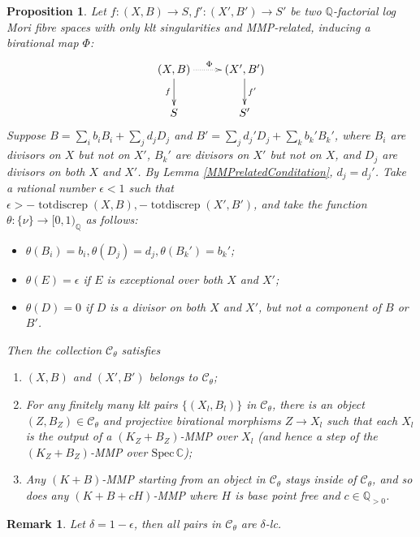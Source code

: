 \documentclass[11pt]{amsart}
\newtheorem{prop}[defn]{Proposition}
\newtheorem{rmk}[defn]{Remark}
\begin{document}
\begin{prop}\label{cat}
  \cite[Lemma 3.6]{brunoLogSarkisovProgram1995}
  Let $ f:(X,B)\to S,f':(X',B')\to S' $ be two $ \mathbb{Q} $-factorial log Mori fibre spaces  with only klt singularities and MMP-related, inducing a birational map $\Phi$:
  \[ \xymatrix{
      (X,B)\ar[d]_f\ar@{.>}[r]^\Phi&(X',B')\ar[d]^{f'}\\
 S&S'} \]
 Suppose  $ B=\sum_ib_iB_i+\sum_jd_jD_j $ and $ B'=\sum_jd_j'D_j+\sum_kb_k'B_k' $, where $ B_i $ are divisors on $ X $ but not on $ X' $, $ B_k' $ are divisors on $ X' $ but not on $ X $, and $ D_j $ are divisors on both $ X $ and $ X' $. By Lemma \ref{MMPrelatedConditation}, $ d_j=d_j' $. Take a rational number $ \epsilon<1 $ such that $ \epsilon> -\operatorname{totdiscrep}(X,B),-\operatorname{totdiscrep}(X',B') $, and take the function $ \theta:\{\nu\}\to [0,1)_\mathbb{Q} $ as follows:
  \begin{itemize}
    \item $ \theta(B_i)=b_i, \theta(D_j)=d_j,\theta(B_k')=b_k'$;
    \item $ \theta(E)=\epsilon $ if $ E $ is exceptional over both $ X $ and $ X' $;
    \item $ \theta(D)=0 $ if $ D $ is a divisor on both $ X $ and $ X' $, but not a component of $ B $ or $ B' $.
  \end{itemize}
  Then the collection $ \mathcal{C}_\theta $ satisfies
  \begin{enumerate}
    \item $ (X,B) $ and $ (X',B') $ belongs to $ \mathcal{C}_\theta $;
    \item For any finitely many klt pairs $ \{(X_l,B_l)\} $ in $ \mathcal{C}_\theta $, there is an object $ (Z,B_Z)\in \mathcal{C}_\theta $ and projective birational morphisms $ Z\to X_l $ such that each $X_l$ is the output of a  $ (K_{Z}+B_{Z}) $-MMP over $ X_l $ (and hence a step of the $(K_Z+B_Z)$-MMP over $ \mathrm{Spec}\,\mathbb{C} $);
    \item Any $ (K+B) $-MMP starting from an object in $ \mathcal{C}_\theta $ stays inside of $ \mathcal{C}_\theta $, and so does any $ (K+B+cH) $-MMP where $ H $ is base point free and $ c\in \mathbb{Q}_{>0} $. 
  \end{enumerate}
\end{prop}
\begin{rmk}
Let $\delta=1-\epsilon$, then all pairs in $\mathcal{C}_{\theta}$ are $\delta$-lc. 
\end{rmk}
\end{document}
